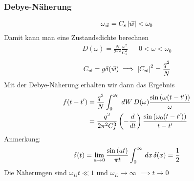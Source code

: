 \subsubsection*{Debye-Näherung}
%
\begin{align*}
  \omega_{\vec{w}} = C_s \left| {\vec{w}} \right| < \omega_0
\end{align*}
%
Damit kann man eine Zustandsdichte berechnen
%
\begin{align*}
  D(\omega) = \frac{N}{2 \pi^2} \frac{\omega^2}{C_s^2} && 0 < \omega < \omega_0
\end{align*}
%
%
\begin{align*}
  C_{\vec{w}} = g \delta({\vec{w}}) \implies \left| C_{\vec{w}} \right|^2 = \frac{q^2}{N}
\end{align*}
%
Mit der Debye-Näherung erhalten wir dann das Ergebnis
%
\begin{align*}
  f(t-t') & = \frac{q^2}{N}\int_{0}^{\omega_0} \,dW\, D(\omega) \frac{\sin{(\omega(t-t'))}}{\omega} \\
          & = \frac{q^2}{2 \pi^2 C_s^3} \left( - \frac{d{}}{d{t}} \right) \frac{\sin{(\omega_0(t-t'))}}{ t- t'}
\end{align*}
%
%
%
Anmerkung:
%
\begin{align*}
  \delta(t) = \lim_{a\to 0} \frac{\sin{(a t)}}{\pi t}
  \int_{0}^{\infty} \,dx\, \delta(x) = \frac{1}{2}
\end{align*}
%
Die Näherungen sind $\omega_D t \ll 1$ und $\omega_D \to \infty$
$\implies t \to 0$
%











